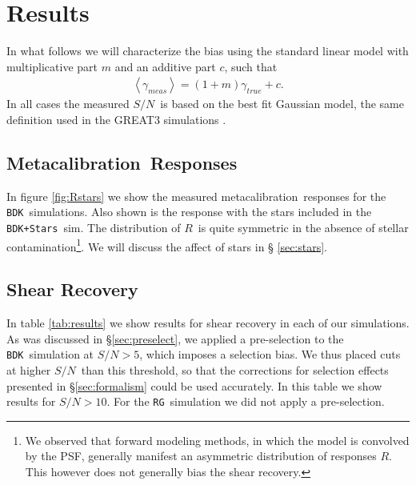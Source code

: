 \documentclass[iop]{emulateapj}
\newcommand{\snr}{$S/N$}
\newcommand{\mcal}{metacalibration}
\newcommand{\Mcal}{Metacalibration}
\newcommand{\mcalR}{\mbox{\boldmath $R$}}
\newcommand{\bdsim}{\texttt{BDK}}
\newcommand{\bdstar}{\texttt{BDK+Stars}}
\newcommand{\rgsim}{\texttt{RG}}
\begin{document}
\section{Results} \label{sec:results}

In what follows we will characterize the bias using the standard linear model
\citep[e.g.][]{great3} with multiplicative part $m$ and an additive part $c$,
such that
\begin{align}
	\left< \gamma_{meas} \right> = (1+m) \gamma_{true} + c.
\end{align}
In all cases the measured \snr\ is based on the best fit Gaussian model, the
same definition used in the GREAT3 simulations \citep{great3}.

\subsection{\Mcal\ Responses}

In figure \ref{fig:Rstars} we show the measured \mcal\ responses for the
\bdsim\  simulations.  Also shown is the response with the stars included in
the \bdstar\ sim.  The distribution of \mcalR\ is quite symmetric in the
absence of stellar contamination\footnote{We observed that forward modeling
methods, in which the model is convolved by the PSF, generally manifest
an asymmetric distribution of responses \mcalR. This however does not
generally bias the shear recovery.}.  We will discuss the affect of stars in \S
\ref{sec:stars}.


\subsection{Shear Recovery} \label{sec:shear_recover}


In table \ref{tab:results} we show results for shear recovery in each of our
simulations.  As was discussed in \S \ref{sec:preselect}, we applied a
pre-selection to the \bdsim\ simulation at \snr$ > 5$, which imposes a
selection bias.  We thus placed cuts at higher \snr\ than this threshold, so
that the corrections for selection effects presented in \S \ref{sec:formalism}
could be used accurately.  In this table we show results for \snr$ > 10$.  For
the \rgsim\ simulation we did not apply a pre-selection.
\end{document}
